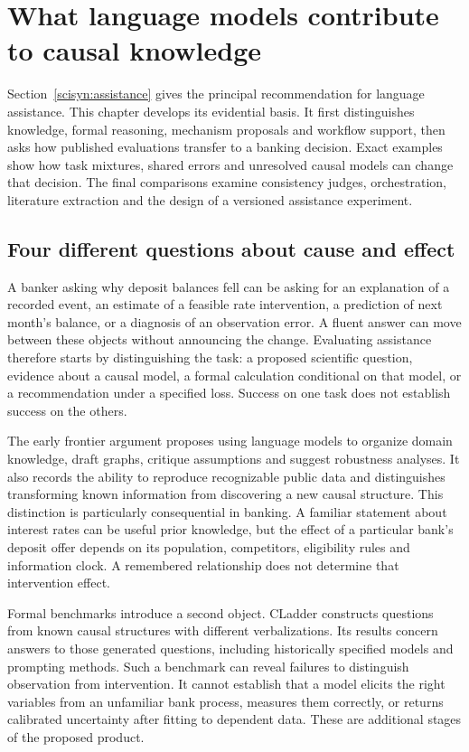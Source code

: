 \chapter{What language models contribute to causal knowledge}
\label{la:frontier}

Section~\ref{scisyn:assistance} gives the principal recommendation for language
assistance. This chapter develops its evidential basis. It first distinguishes
knowledge, formal reasoning, mechanism proposals and workflow support, then
asks how published evaluations transfer to a banking decision. Exact examples
show how task mixtures, shared errors and unresolved causal models can change
that decision. The final comparisons examine consistency judges, orchestration,
literature extraction and the design of a versioned assistance experiment.

\section{Four different questions about cause and effect}

A banker asking why deposit balances fell can be asking for an explanation of
a recorded event, an estimate of a feasible rate intervention, a prediction of
next month's balance, or a diagnosis of an observation error. A fluent answer
can move between these objects without announcing the change. Evaluating assistance therefore starts by distinguishing the task: a proposed scientific question, evidence about a causal model,
a formal calculation conditional on that model, or a recommendation under a
specified loss. Success on one task does not establish success on the others.

The early frontier argument proposes using language models to organize domain
knowledge, draft graphs, critique assumptions and suggest robustness analyses.
It also records the ability to reproduce recognizable public data and
distinguishes transforming known information from discovering a new causal
structure. \cite{v12_la_2305_00050} This distinction is particularly consequential
in banking. A familiar statement about interest rates can be useful prior
knowledge, but the effect of a particular bank's deposit offer depends on its
population, competitors, eligibility rules and information clock. A remembered
relationship does not determine that intervention effect.

Formal benchmarks introduce a second object. CLadder constructs questions from
known causal structures with different verbalizations. Its results concern
answers to those generated questions, including historically specified models
and prompting methods. \cite{v12_la_2312_04350} Such a benchmark can reveal failures
to distinguish observation from intervention. It cannot establish that a model
elicits the right variables from an unfamiliar bank process, measures them
correctly, or returns calibrated uncertainty after fitting to dependent data.
These are additional stages of the proposed product.


